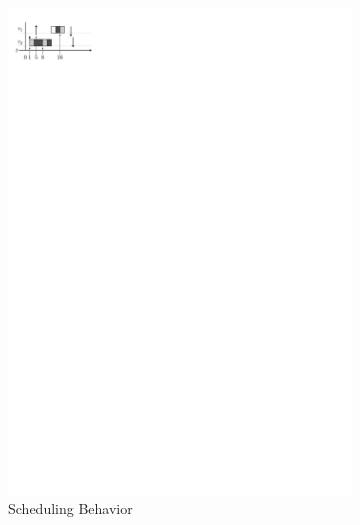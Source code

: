 \documentclass[a4paper,UKenglish,cleveref,autoref,english]{lipics-v2019}
\begin{document}
\begin{figure}[b]
  \centering
  \begin{subfigure}{.35\linewidth}
    \centering
    \includegraphics[width=\linewidth]{preemptivity}
    \caption{Scheduling Behavior}
    \label{fig:preemptivity}
  \end{subfigure}
  \begin{subfigure}{.58\linewidth}
    \centering

\end{subfigure}
\end{figure}
\end{document}
